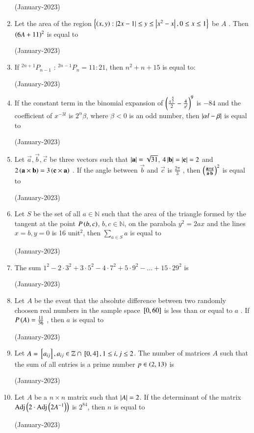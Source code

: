 \documentclass[journal]{IEEEtran}
\begin{document}
\begin{enumerate}
\hfill(January-2023)

\item Let the area of the region $\left\{\left(x,y\right) : \left\vert2x-1\right\vert \leq y \leq \left\vert x^2 - x\right\vert, 0 \leq x \leq 1\right\}$
 be $A$ . Then $\left(6A + 11\right)^2$  
 is equal to 

 \hfill(January-2023)

 \item If $^{2n+1}P_{n-1} \text{ : } ^{2n-1}P_n = 11:21$, then $n^2 + n +15$ is equal to:

\hfill (January-2023)

\item If the constant term in the binomial expansion of 
$\left(\frac{x^{\frac{5}{2}}}{2} - \frac{4}{x^l}\right)^9$ is $-84$ and the coefficient of $x^{-3l}$ 
 is $2^{\alpha}\beta$, where $\beta < 0$
 is an odd number, then $\left\vert\alpha l - \beta\right\vert$
 is equal to

 \hfill(January-2023)

 \item Let $\vec{a}, \vec{b}, \vec{c}$
 be three vectors such that
$\left\vert\mathbf{a}\right\vert = \sqrt{31}$, $4\left\vert\mathbf{b}\right\vert = \left\vert\mathbf{c}\right\vert = 2$
 and $2\left(\mathbf{a} \times \mathbf{b}\right) = 3 \left(\mathbf{c} \times \mathbf{a}\right)$
. If the angle between $\vec{b}$
 and $\vec{c}$
 is $\frac{2\pi}{3}$
, then $\left(\frac{\mathbf{a} \times \mathbf{c}}{\mathbf{a}\cdot \mathbf{b}}\right)^2$ is equal to

\hfill (January-2023)

\item Let $S$ be the set of all $a \in \mathbb{N}$ such that the area of the triangle formed by the tangent at the point $P\left(b,c\right)$, $b,c \in \mathbb{N}$, on the parabola $y^2 = 2ax $ and the lines $x = b, y = 0 $ is 16 unit$^2$, then $\sum_{a \in S} a $ is equal to 

\hfill (January-2023)

\item The sum $1^2 - 2\cdot3^2 + 3\cdot5^2 - 4\cdot7^2 + 5\cdot9^2 - \ldots + 15\cdot29^2$ is 

\hfill(January-2023)

\item Let $A$ be the event that the absolute difference between two randomly choosen real numbers in the sample space ${}\left[0,60\right]$
 is less than or equal to $a$ . If $P\left(A\right) = \frac{11}{36}$ , then $a$ 
 is equal to 

 \hfill (January-2023)

 \item Let $A = {}\left[a_{ij}\right], a_{ij} \in \mathbb{Z} \cap {}\left[0,4\right], 1 \leq i,j \leq 2$. 
The number of matrices $A$ such that the sum of all entries is a prime number $p \in \left(2,13\right)$ is 

\hfill (January-2023)

\item Let $A$ be a $n \times n $ matrix such that $\left\vert A\right\vert = 2$. If the determinant of the matrix $\operatorname{Adj}\left(2\cdot \operatorname{Adj}\left(2A^{-1}\right)\right)$ is $2^{84}$, then $n$ is equal to 

\hfill (January-2023)
\end{enumerate}
\end{document}
